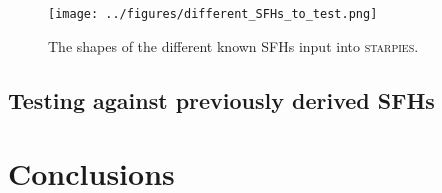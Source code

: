 \documentclass[useAMS,usenatbib]{mn2e}
\begin{document}
\begin{figure}
\centering
\texttt{[image: ../figures/different\_SFHs\_to\_test.png]}
\caption{The shapes of the different known SFHs input into \textsc{starpies}.}
\label{fig:differentSFHs}
\end{figure}

\subsection{Testing against previously derived SFHs}

\section{Conclusions}


  
\end{document}
